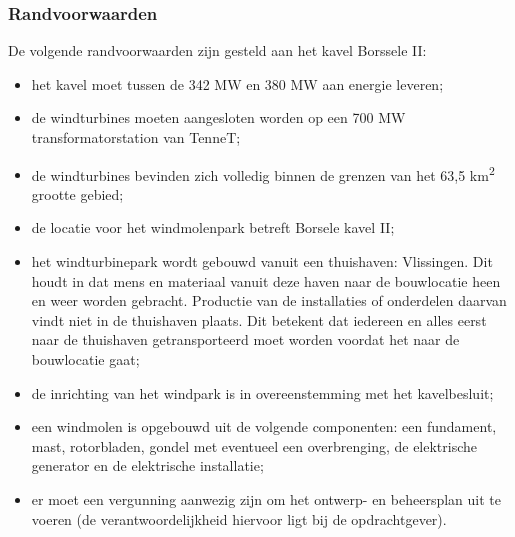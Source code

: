 \documentclass[numbers=endperiod]{scrartcl}
\begin{document}
	\subsubsection{Randvoorwaarden}
	De volgende randvoorwaarden zijn gesteld aan het kavel Borssele II:
	\begin{itemize}[noitemsep]
		\item het kavel moet tussen de 342 MW en 380 MW aan energie leveren;
		\item de windturbines moeten aangesloten worden op een 700 MW transformatorstation van TenneT;
		\item de windturbines bevinden zich volledig binnen de grenzen van het 63,5 km\textsuperscript{2} grootte gebied;
		\item de locatie voor het windmolenpark betreft Borsele kavel II;
		\item het windturbinepark wordt gebouwd vanuit een thuishaven: Vlissingen. Dit houdt in dat mens en materiaal
		vanuit deze haven naar de bouwlocatie heen en weer worden gebracht. Productie van de installaties
		of onderdelen daarvan vindt niet in de thuishaven plaats. Dit betekent dat iedereen en alles eerst naar
		de thuishaven getransporteerd moet worden voordat het naar de bouwlocatie gaat;
		\item de inrichting van het windpark is in overeenstemming met het kavelbesluit;
		\item een windmolen is opgebouwd uit de volgende componenten: een fundament, mast, rotorbladen, gondel met eventueel een overbrenging, de elektrische generator en de elektrische installatie;
		\item er moet een vergunning aanwezig zijn om het ontwerp- en beheersplan uit te voeren (de verantwoordelijkheid hiervoor ligt bij de opdrachtgever).
	\end{itemize}
\end{document}
